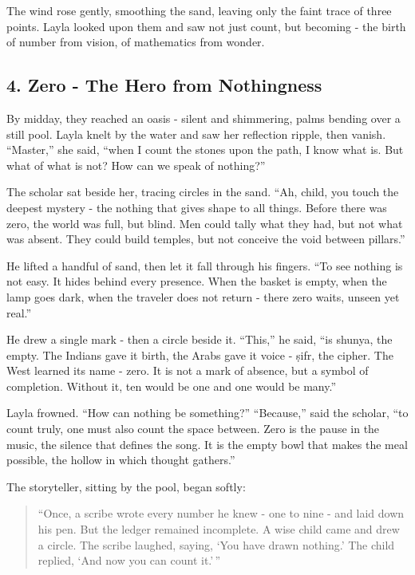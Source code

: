 \documentclass[
  letterpaper,
  DIV=11,
  numbers=noendperiod]{scrreprt}
\begin{document}
The wind rose gently, smoothing the sand, leaving only the faint trace
of three points. Layla looked upon them and saw not just count, but
becoming - the birth of number from vision, of mathematics from wonder.

\subsection{4. Zero - The Hero from
Nothingness}\label{zero---the-hero-from-nothingness}

By midday, they reached an oasis - silent and shimmering, palms bending
over a still pool. Layla knelt by the water and saw her reflection
ripple, then vanish. ``Master,'' she said, ``when I count the stones
upon the path, I know what is. But what of what is not? How can we speak
of nothing?''

The scholar sat beside her, tracing circles in the sand. ``Ah, child,
you touch the deepest mystery - the nothing that gives shape to all
things. Before there was zero, the world was full, but blind. Men could
tally what they had, but not what was absent. They could build temples,
but not conceive the void between pillars.''

He lifted a handful of sand, then let it fall through his fingers. ``To
see nothing is not easy. It hides behind every presence. When the basket
is empty, when the lamp goes dark, when the traveler does not return -
there zero waits, unseen yet real.''

He drew a single mark - then a circle beside it. ``This,'' he said, ``is
shunya, the empty. The Indians gave it birth, the Arabs gave it voice -
ṣifr, the cipher. The West learned its name - zero. It is not a mark of
absence, but a symbol of completion. Without it, ten would be one and
one would be many.''

Layla frowned. ``How can nothing be something?'' ``Because,'' said the
scholar, ``to count truly, one must also count the space between. Zero
is the pause in the music, the silence that defines the song. It is the
empty bowl that makes the meal possible, the hollow in which thought
gathers.''

The storyteller, sitting by the pool, began softly:

\begin{quote}
``Once, a scribe wrote every number he knew - one to nine - and laid
down his pen. But the ledger remained incomplete. A wise child came and
drew a circle. The scribe laughed, saying, `You have drawn nothing.' The
child replied, `And now you can count it.'\,''
\end{quote}
\end{document}
